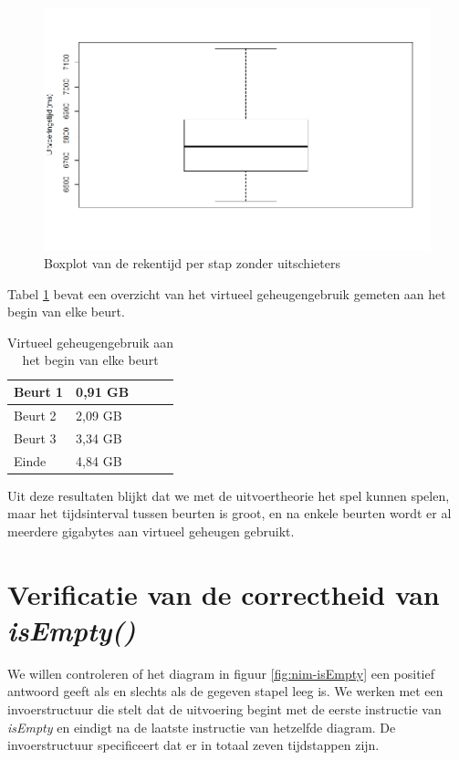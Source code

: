 \begin{figure}
	\includegraphics[width=1.05\textwidth]{chap-evaluatie/boxplotnooutliers.png}
	\caption{Boxplot van de rekentijd per stap zonder uitschieters}
	\label{fig:ms-nooutliers}
\end{figure}

Tabel \ref{tab:sim-mem} bevat een overzicht van het virtueel geheugengebruik gemeten aan het begin van elke beurt.


\begin{table}[]
	\centering
	\begin{tabular}{|l|l|l|l|l|}
		\hline
		Beurt 1 & 0,91 GB  \\ \hline
		Beurt 2 & 2,09 GB  \\ \hline
		Beurt 3 & 3,34 GB  \\ \hline
		Einde   & 4,84 GB  \\ \hline
	\end{tabular}
	\caption{Virtueel geheugengebruik aan het begin van elke beurt}
	\label{tab:sim-mem}
\end{table}

Uit deze resultaten blijkt dat we met de uitvoertheorie het spel kunnen spelen, maar het tijdsinterval tussen beurten is groot, en na enkele beurten wordt er al meerdere gigabytes aan virtueel geheugen gebruikt.

\section{Verificatie van de correctheid van \textit{isEmpty()}}

We willen controleren of het diagram in figuur \ref{fig:nim-isEmpty} een positief antwoord geeft als en slechts als de gegeven stapel leeg is. We werken met een invoerstructuur die stelt dat de uitvoering begint met de eerste instructie van \textit{isEmpty} en eindigt na de laatste instructie van hetzelfde diagram. De invoerstructuur specificeert dat er in totaal zeven tijdstappen zijn.

